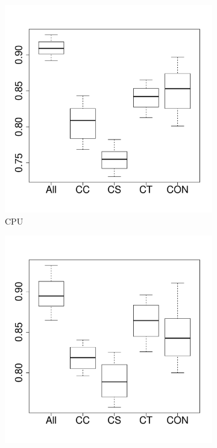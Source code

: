 \begin{figure}[t]
\begin{subfigure}{0.19\textwidth}
                \includegraphics[width=\linewidth]{Figures/cpu-hadoopkeep-importance.pdf}
                \caption{CPU}
        \end{subfigure}%
        \begin{subfigure}{0.19\textwidth}
                \includegraphics[width=\linewidth]{Figures/mem-hadoopkeep-importance.pdf}

\end{subfigure}
\end{figure}
